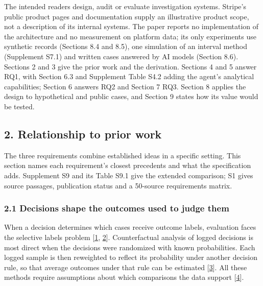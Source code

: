 \documentclass[
  11pt,
]{article}
\begin{document}
The intended readers design, audit or evaluate investigation systems.
Stripe's public product pages and documentation supply an illustrative
product scope, not a description of its internal systems. The paper
reports no implementation of the architecture and no measurement on
platform data; its only experiments use synthetic records (Sections 8.4
and 8.5), one simulation of an interval method (Supplement S7.1) and
written cases answered by AI models (Section 8.6). Sections 2 and 3 give
the prior work and the derivation. Sections 4 and 5 answer RQ1, with
Section 6.3 and Supplement Table S4.2 adding the agent's analytical
capabilities; Section 6 answers RQ2 and Section 7 RQ3. Section 8 applies
the design to hypothetical and public cases, and Section 9 states how
its value would be tested.

\FloatBarrier

\hypertarget{relationship-to-prior-work}{%
\subsection{2. Relationship to prior
work}\label{relationship-to-prior-work}}

\suppressfloats[t]

The three requirements combine established ideas in a specific setting.
This section names each requirement's closest precedents and what the
specification adds. Supplement S9 and its Table S9.1 give the extended
comparison; S1 gives source passages, publication status and a 50-source
requirements matrix.

\hypertarget{decisions-shape-the-outcomes-used-to-judge-them}{%
\subsubsection{2.1 Decisions shape the outcomes used to judge
them}\label{decisions-shape-the-outcomes-used-to-judge-them}}

When a decision determines which cases receive outcome labels,
evaluation faces the selective labels problem
{[}\protect\hyperlink{ref-Lakkaraju2017Selective}{1},
\protect\hyperlink{ref-Kilbertus2020Fair}{2}{]}. Counterfactual analysis
of logged decisions is most direct when the decisions were randomized
with known probabilities. Each logged sample is then reweighted to
reflect its probability under another decision rule, so that average
outcomes under that rule can be estimated
{[}\protect\hyperlink{ref-Bottou2013Counterfactual}{3}{]}. All these
methods require assumptions about which comparisons the data support
{[}\protect\hyperlink{ref-HernanRobins2020}{4}{]}.
\end{document}
